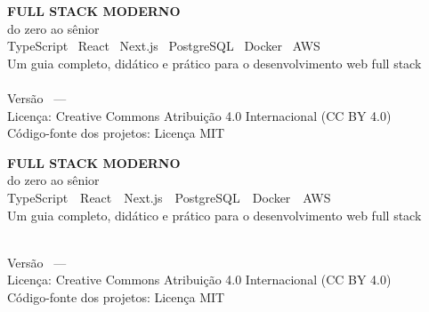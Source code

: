 \thispagestyle{empty}
\ifdefined\HCode
  \begin{center}
    \vspace*{4cm}
    {\bfseries\Huge FULL STACK MODERNO}\\[0.6em]
    {\Large do zero ao sênior}\\[1.6em]
    {\large TypeScript \textbullet\ React \textbullet\ Next.js
     \textbullet\ PostgreSQL \textbullet\ Docker \textbullet\ AWS}\\[2.4em]
    {\large Um guia completo, didático e prático para o
     desenvolvimento web full stack}\\[0.4em]
    \vfill
    {\normalsize \autordolivro}\\[0.5em]
    {\small Versão \versaodolivro\ --- \datadolivro}\\[1em]
    {\small Licença: Creative Commons Atribuição 4.0 Internacional (CC BY 4.0)}\\[0.2em]
    {\small Código-fonte dos projetos: Licença MIT}
  \end{center}
\else
  \vspace*{4.5cm}
  \begin{center}
    {\sffamily\bfseries\Huge\color{white} FULL STACK MODERNO}\\[0.6em]
    {\sffamily\Large\color{white} do zero ao sênior}\\[1.8em]
    {\sffamily\large\color{azulclaro}
     TypeScript \,\textbullet\, React \,\textbullet\, Next.js \,\textbullet\, PostgreSQL
     \,\textbullet\, Docker \,\textbullet\, AWS}\\[2.6em]
    {\sffamily\large\color{white} Um guia completo, didático e prático para o
     desenvolvimento web full stack}\\[0.4em]
  \end{center}
  \vfill
  \begin{center}
    {\sffamily\normalsize\color{azulclaro} \autordolivro}\\[0.5em]
    {\sffamily\small\color{azulclaro} Versão \versaodolivro\ --- \datadolivro}\\[1.2em]
    {\sffamily\small\color{azulclaro} Licença: Creative Commons Atribuição 4.0 Internacional (CC BY 4.0)}\\[0.2em]
    {\sffamily\small\color{azulclaro} Código-fonte dos projetos: Licença MIT}
  \end{center}
\fi
\clearpage
